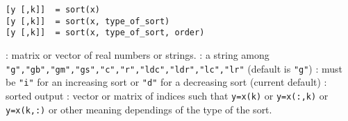 
\begin{mandesc}
\end{mandesc}

\begin{calling_sequence}
\begin{verbatim}
[y [,k]]  = sort(x)
[y [,k]]  = sort(x, type_of_sort)
[y [,k]]  = sort(x, type_of_sort, order)
\end{verbatim}
\end{calling_sequence}
\begin{parameters}
  \begin{varlist}
     :  matrix or vector of real numbers or strings.
     : a string among
    \verb+"g","gb","gm","gs","c","r","ldc","ldr","lc","lr"+ (default
    is \verb+"g"+)
     : must be \verb+"i"+ for an increasing sort or \verb+"d"+ for a
                    decreasing sort (current default)
     : sorted output
     : vector or matrix of indices such that \verb+y=x(k)+
    or  \verb+y=x(:,k)+ or  \verb+y=x(k,:)+ or other meaning
    dependings of the type of the sort.
  \end{varlist}
\end{parameters}

